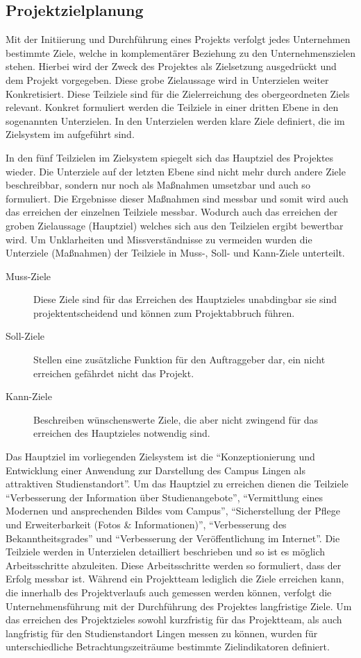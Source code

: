 \subsection{Projektzielplanung}
\label{sec:Projektzielplanung}

Mit der Initiierung und Durchführung eines Projekts verfolgt jedes Unternehmen
bestimmte Ziele, welche in komplementärer Beziehung zu den Unternehmenszielen
stehen. Hierbei wird der Zweck des Projektes als Zielsetzung ausgedrückt und dem
Projekt vorgegeben. Diese  grobe Zielaussage wird in Unterzielen weiter
Konkretisiert. Diese Teilziele sind für die Zielerreichung des obergeordneten
Ziels relevant. Konkret formuliert werden die Teilziele in einer dritten Ebene
in den sogenannten Unterzielen. In den Unterzielen werden klare Ziele
definiert, die im Zielsystem im  aufgeführt sind.

In den fünf Teilzielen im Zielsystem spiegelt sich das Hauptziel des Projektes
wieder. Die Unterziele auf der letzten Ebene sind nicht mehr durch andere Ziele
beschreibbar, sondern nur noch als Maßnahmen umsetzbar und auch so formuliert.
Die Ergebnisse dieser Maßnahmen sind messbar und somit wird auch das erreichen
der einzelnen Teilziele messbar. Wodurch auch das erreichen der groben
Zielaussage (Hauptziel) welches sich aus den Teilzielen ergibt bewertbar wird.
Um Unklarheiten und Missverständnisse zu vermeiden wurden die Unterziele
(Maßnahmen) der Teilziele in Muss-, Soll- und Kann-Ziele unterteilt.

\begin{description}
\item[Muss-Ziele]
Diese Ziele sind für das Erreichen des Hauptzieles unabdingbar sie sind
projektentscheidend und können zum Projektabbruch führen.
\item[Soll-Ziele]
Stellen eine zusätzliche Funktion für den Auftraggeber dar, ein nicht erreichen
gefährdet nicht das Projekt.
\item[Kann-Ziele]
Beschreiben wünschenswerte Ziele, die aber nicht zwingend für das erreichen des
Hauptzieles notwendig sind.
\end{description}

Das Hauptziel im vorliegenden Zielsystem ist die "`Konzeptionierung und
Entwicklung einer Anwendung zur Darstellung des Campus Lingen als attraktiven
Studienstandort"'. Um das Hauptziel zu erreichen dienen die Teilziele
"`Verbesserung der Information über Studienangebote"', "`Vermittlung eines
Modernen und ansprechenden Bildes vom Campus"', "`Sicherstellung der Pflege und
Erweiterbarkeit (Fotos \& Informationen)"', "`Verbesserung des
Bekanntheitsgrades"' und "`Verbesserung der Veröffentlichung im Internet"'. Die
Teilziele werden in Unterzielen detailliert beschrieben und so ist es möglich
Arbeitsschritte abzuleiten. Diese Arbeitsschritte werden so formuliert, dass
der Erfolg messbar ist. Während ein Projektteam lediglich die Ziele erreichen
kann, die innerhalb des Projektverlaufs auch gemessen werden können, verfolgt
die Unternehmensführung mit der Durchführung des Projektes langfristige Ziele. 
Um das erreichen des Projektzieles sowohl kurzfristig für das Projektteam, als
auch langfristig für den Studienstandort Lingen messen zu können, wurden für
unterschiedliche Betrachtungszeiträume  bestimmte Zielindikatoren definiert.